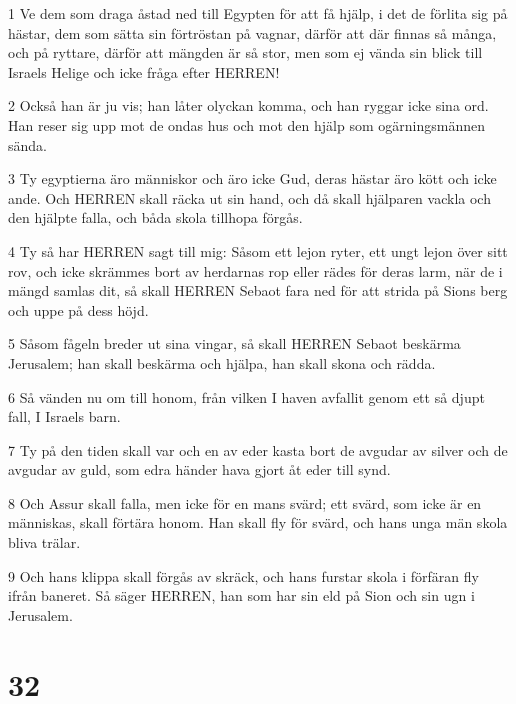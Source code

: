 \par 1 Ve dem som draga åstad ned till Egypten för att få hjälp, i det de förlita sig på hästar, dem som sätta sin förtröstan på vagnar, därför att där finnas så många, och på ryttare, därför att mängden är så stor, men som ej vända sin blick till Israels Helige och icke fråga efter HERREN!
\par 2 Också han är ju vis; han låter olyckan komma, och han ryggar icke sina ord. Han reser sig upp mot de ondas hus och mot den hjälp som ogärningsmännen sända.
\par 3 Ty egyptierna äro människor och äro icke Gud, deras hästar äro kött och icke ande. Och HERREN skall räcka ut sin hand, och då skall hjälparen vackla och den hjälpte falla, och båda skola tillhopa förgås.
\par 4 Ty så har HERREN sagt till mig: Såsom ett lejon ryter, ett ungt lejon över sitt rov, och icke skrämmes bort av herdarnas rop eller rädes för deras larm, när de i mängd samlas dit, så skall HERREN Sebaot fara ned för att strida på Sions berg och uppe på dess höjd.
\par 5 Såsom fågeln breder ut sina vingar, så skall HERREN Sebaot beskärma Jerusalem; han skall beskärma och hjälpa, han skall skona och rädda.
\par 6 Så vänden nu om till honom, från vilken I haven avfallit genom ett så djupt fall, I Israels barn.
\par 7 Ty på den tiden skall var och en av eder kasta bort de avgudar av silver och de avgudar av guld, som edra händer hava gjort åt eder till synd.
\par 8 Och Assur skall falla, men icke för en mans svärd; ett svärd, som icke är en människas, skall förtära honom. Han skall fly för svärd, och hans unga män skola bliva trälar.
\par 9 Och hans klippa skall förgås av skräck, och hans furstar skola i förfäran fly ifrån baneret. Så säger HERREN, han som har sin eld på Sion och sin ugn i Jerusalem.

\chapter{32}


